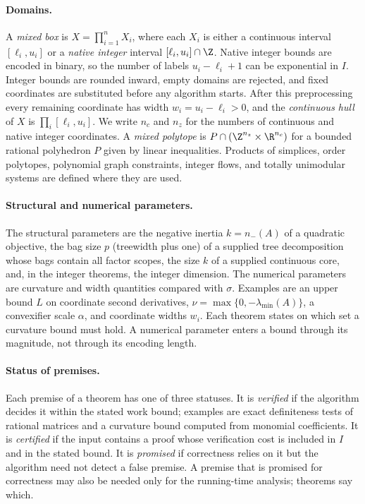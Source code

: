 \paragraph{Domains.}
A \emph{mixed box} is $X=\prod_{i=1}^nX_i$, where each $X_i$ is either a
continuous interval $[\ell_i,u_i]$ or a \emph{native integer} interval
$[\ell_i,u_i]\cap\Z$. Native integer bounds are encoded in binary, so the
number of labels $u_i-\ell_i+1$ can be exponential in $I$. Integer bounds
are rounded inward, empty domains are rejected, and fixed coordinates are
substituted before any algorithm starts. After this preprocessing every
remaining coordinate has width $w_i=u_i-\ell_i>0$, and the
\emph{continuous hull} of $X$ is $\prod_i[\ell_i,u_i]$. We write $n_c$ and
$n_z$ for the numbers of continuous and native integer coordinates. A
\emph{mixed polytope} is $P\cap(\Z^{n_z}\times\R^{n_c})$ for a bounded
rational polyhedron $P$ given by linear inequalities. Products of simplices,
order polytopes, polynomial graph constraints, integer flows, and totally
unimodular systems are defined where they are used.

\paragraph{Structural and numerical parameters.}
The structural parameters are the negative inertia $k=n_-(A)$ of a quadratic
objective, the bag size $p$ (treewidth plus one) of a supplied tree
decomposition whose bags contain all factor scopes, the size $k$ of a
supplied continuous core, and, in the integer theorems, the integer
dimension. The numerical parameters are curvature and width quantities
compared with $\sigma$. Examples are an upper bound $L$ on coordinate second
derivatives, $\nu=\max\{0,-\lambda_{\min}(A)\}$, a convexifier scale
$\alpha$, and coordinate widths $w_i$. Each theorem states on which set a
curvature bound must hold. A numerical parameter enters a bound through its
magnitude, not through its encoding length.

\paragraph{Status of premises.}
Each premise of a theorem has one of three statuses.
It is \emph{verified} if the algorithm decides it within the stated work
bound; examples are exact definiteness tests of rational matrices and a
curvature bound computed from monomial coefficients. It is \emph{certified}
if the input contains a proof whose verification cost is included in $I$ and
in the stated bound. It is \emph{promised} if correctness relies on it but
the algorithm need not detect a false premise. A premise that is
promised for correctness may also be needed only for the running-time
analysis; theorems say which.

